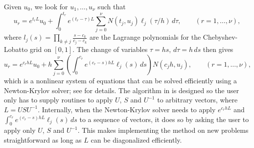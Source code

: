 \documentclass[11pt]{article}
\theoremstyle{plain}
\theoremstyle{definition}
\theoremstyle{definition}
\begin{document}
%
Given $u_0$, we look for $u_1,\dots,u_\nu$ such that
%
\begin{equation}
  u_r = e^{t_rL}u_0 + \int_0^{t_r}e^{(t_r-\tau)L}\sum_{j=0}^\nu N(t_j,u_j)\ell_j(\tau/h)\,d\tau,
  \qquad (r=1,\dots,\nu),
\end{equation}
%
where $l_j(s)=\prod_{k\ne j}\frac{s-c_k}{c_j-c_k}$ are
the Lagrange polynomials for the Chebyshev-Lobatto grid on $[0,1]$.
The change of variables $\tau=hs$, $d\tau=h\,ds$ then gives
%
\begin{equation}\label{eq:setd:eqs}
  u_r = e^{c_rhL}u_0 + h\sum_{j=0}^\nu \left(\int_0^{c_r}e^{(c_r-s)hL}\ell_j(s)\,ds\right) N(c_jh,u_j),
  \qquad (r=1,\dots,\nu),
\end{equation}
%
which is a nonlinear system of equations that can be solved
efficiently using a Newton-Krylov solver; see
\cite{chen-wilkening:setd} for details. The algorithm in
\cite{chen-wilkening:setd} is designed so the user only has to supply
routines to apply $U$, $S$ and $U^{-1}$ to arbitrary vectors, where
$L=USU^{-1}$. Internally, when the Newton-Krylov solver needs to apply
$e^{c_rhL}$ and $\int_0^{c_r} e^{(c_r-s)hL}\ell_j(s)\,ds$ to a
sequence of vectors, it does so by asking the user to apply only $U$,
$S$ and $U^{-1}$. This makes implementing the method on new problems
straightforward as long as $L$ can be diagonalized efficiently.
\end{document}
